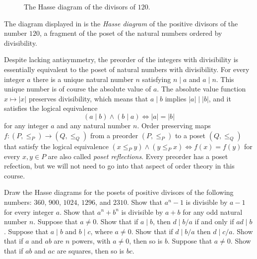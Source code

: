 \begin{figure}[t]
  \caption{The Hasse diagram of the divisors of $120$.}
  \label{figure:hasse-diagram-120}
\end{figure}

The diagram displayed in  is the \emph{Hasse diagram} of the positive divisors of the number $120$, a fragment of the poset of the natural numbers ordered by divisibility.

Despite lacking antisymmetry, the preorder of the integers with divisibility is essentially equivalent to the poset of natural numbers with divisibility. For every integer $a$ there is a unique natural number $n$ satisfying $n\mid a$ and $a\mid n$. This unique number is of course the absolute value of $a$. The absolute value function $x\mapsto |x|$ preserves divisibility, which means that $a\mid b$ implies $|a| \mid |b|$, and it satisfies the logical equivalence
\begin{equation*}
  (a\mid b)\land (b\mid a) \Leftrightarrow |a|=|b|
\end{equation*}
for any integer $a$ and any natural number $n$. Order preserving maps $f : (P,\leq_P) \to (Q,\leq_Q)$ from a preorder $(P,\leq_P)$ to a poset $(Q,\leq_Q)$ that satisfy the logical equivalence $(x\leq_P y)\land (y\leq_P x) \Leftrightarrow f(x)=f(y)$ for every $x,y\in P$ are also called \emph{poset reflections}. Every preorder has a poset refection, but we will not need to go into that aspect of order theory in this course.

\exercises

\begin{starter}
  \exercise Draw the Hasse diagrams for the posets of positive divisors of the following numbers: $360$, $900$, $1024$, $1296$, and $2310$.
  \exercise Show that $a^n-1$ is divisible by $a-1$ for every integer $a$.
  \exercise Show that $a^n+b^n$ is divisible by $a+b$ for any odd natural number $n$.
  \exercise Suppose that $a\neq 0$. Show that if $a\mid b$, then $d\mid b/a$ if and only if $ad\mid b$.
  \exercise Suppose that $a\mid b$ and $b\mid c$, where $a\neq 0$. Show that if $d\mid b/a$ then $d\mid c/a$.
  \exercise Show that if $a$ and $ab$ are $n$\supth{} powers, with $a\neq 0$, then so is $b$.
  \exercise Suppose that $a\neq 0$. Show that if $ab$ and $ac$ are squares, then so is $bc$.  
\end{starter}

